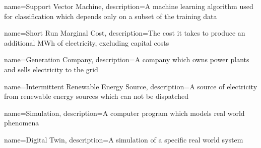 



{
	name=Support Vector Machine,
	description={A machine learning algorithm used for classification which depends only on a subset of the training data}
}





{
	name=Short Run Marginal Cost,
	description={The cost it takes to produce an additional MWh of electricity, excluding capital costs}
}
%


{
	name=Generation Company,
	description={A company which owns power plants and sells electricity to the grid}
}




{
	name=Intermittent Renewable Energy Source,
	description={A source of electricity from renewable energy sources which can not be dispatched}
}




{
	name=Simulation,
	description={A computer program which models real world phenomena}
}



{
	name=Digital Twin,
	description={A simulation of a specific real world system}
}


